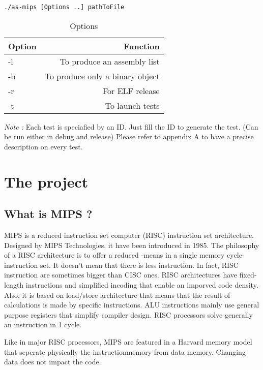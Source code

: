 \documentclass[twoside,twocolumn]{article}
\begin{document}
\begin{lstlisting}
./as-mips [Options ..] pathToFile
\end{lstlisting}


\begin{table}[h!]
\caption{Options}
\centering
\begin{tabular}{|l|r|}
\hline
Option & Function \\
\hline
-l & To produce an assembly list \\
-b & To produce only a binary object \\
-r & For ELF release \\
-t & To launch tests \\
\hline
\end{tabular}
\end{table}

\textit{Note :} Each test is speciafied by an ID. Just fill the ID to generate the test. (Can be run either in debug and release) Please refer to appendix A to have a precise description on every test.



\section{The project}

\subsection{What is MIPS ?}
MIPS is a reduced instruction set computer (RISC) instruction set architecture. Designed by MIPS Technologies, it have been introduced in 1985. The philosophy of a RISC architecture is to offer a reduced -means in a single memory cycle- instruction set. It doesn't mean that there is less instruction. In fact, RISC instruction are sometimes bigger than CISC ones. RISC architectures have fixed-length instructions and simplified incoding that enable an imporved code density. Also, it is based on load/store architecture that means that the result of calculations is made by specific instructions. ALU instructions mainly use general purpose registers that simplify compiler design. RISC processors solve generally an instruction in 1 cycle.

Like in major RISC processors, MIPS are featured in a Harvard memory model that seperate physically the instructionmemory from data memory. Changing data does not impact the code.
\end{document}
